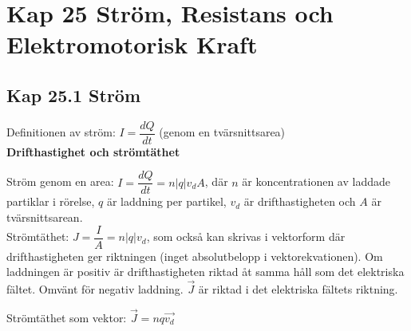\documentclass[a4paper]{article}
\begin{document}
\section{Kap 25 Ström, Resistans och Elektromotorisk Kraft}

\subsection{Kap 25.1 Ström}

Definitionen av ström: $I = \dfrac{dQ}{dt}$ (genom en tvärsnittsarea)
\\[4mm]

\textbf{Drifthastighet och strömtäthet}

Ström genom en area: $I = \dfrac{dQ}{dt} = n\vert q \vert v_dA$, där $n$ är koncentrationen av laddade partiklar i rörelse, $q$ är laddning per partikel, $v_d$ är drifthastigheten och $A$ är tvärsnittsarean.
\\[2mm]

Strömtäthet: $J = \dfrac{I}{A} = n\vert q \vert v_d$, som också kan skrivas i vektorform där drifthastigheten ger riktningen (inget absolutbelopp i vektorekvationen). Om laddningen är positiv är drifthastigheten riktad åt samma håll som det elektriska fältet. Omvänt för negativ laddning. $\vec{J}$ är riktad i det elektriska fältets riktning.

Strömtäthet som vektor: $\vec{J} =  nq\vec{v_d}$
\end{document}
